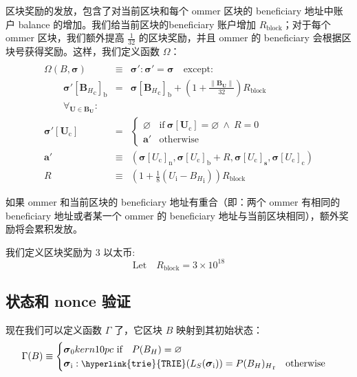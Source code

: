\documentclass[9pt,oneside]{amsart}
\begin{document}
\begin{multicols}{2}
区块奖励的发放，包含了对当前区块和每个 ommer 区块的 beneficiary 地址中账户 balance 的增加。我们给当前区块的beneficiary 账户增加 \hyperlink{R__block}{$R_{\mathrm{block}}$}；对于每个 ommer 区块，我们额外提高 $\frac{1}{32}$ 的区块奖励，并且 ommer 的 beneficiary 会根据区块号获得奖励。\hypertarget{Omega}{}这样，我们定义函数 $\Omega$：
\begin{eqnarray}
\\ \nonumber
\Omega(B, \boldsymbol{\sigma}) & \equiv & \boldsymbol{\sigma}': \boldsymbol{\sigma}' = \boldsymbol{\sigma} \quad \text{except:} \\
\qquad\boldsymbol{\sigma}'[{\mathbf{B}_{H}}_{\mathrm{c}}]_{\mathrm{b}} & = & \boldsymbol{\sigma}[{\mathbf{B}_{H}}_{\mathrm{c}}]_{\mathrm{b}} + \left(1 + \frac{\lVert \mathbf{B}_{\mathbf{U}}\rVert}{32}\right)R_{\mathrm{block}} \\
\qquad\forall_{\mathbf{U} \in \mathbf{B}_{\mathbf{U}}}: \\ \nonumber
\boldsymbol{\sigma}'[\mathbf{U}_{\mathrm{c}}] & = & \begin{cases}
\varnothing &\text{if}\ \boldsymbol{\sigma}[\mathbf{U}_{\mathrm{c}}] = \varnothing\ \wedge\ R = 0 \\
\mathbf{a}' &\text{otherwise}
\end{cases} \\
\mathbf{a}' &\equiv& (\boldsymbol{\sigma}[U_{\mathrm{c}}]_{\mathrm{n}}, \boldsymbol{\sigma}[U_{\mathrm{c}}]_{\mathrm{b}} + R, \boldsymbol{\sigma}[U_{\mathrm{c}}]_{\mathbf{s}}, \boldsymbol{\sigma}[U_{\mathrm{c}}]_{\mathrm{c}}) \\
R & \equiv & \left(1 + \frac{1}{8} (U_{\mathrm{i}} - {B_{H}}_{\mathrm{i}})\right) R_{\mathrm{block}}
\end{eqnarray}

如果 ommer 和当前区块的 beneficiary 地址有重合（即：两个 ommer 有相同的 beneficiary 地址或者某一个 ommer 的 beneficiary 地址与当前区块相同），额外奖励将会累积发放。

我们定义区块奖励为 3 以太币:
\begin{equation}
\text{Let} \quad R_{\mathrm{block}} = 3 \times 10^{18}
\end{equation}

\subsection{状态和 nonce 验证}\label{sec:statenoncevalidation}

\hypertarget{Gamma}{}现在我们可以定义函数 $\Gamma$ 了，它区块 $B$ 映射到其初始状态：
\begin{equation}
\Gamma(B) \equiv \begin{cases}
\boldsymbol{\sigma}_0 kern 10pc \ \text{if} \quad P(B_{H}) = \varnothing \\
\boldsymbol{\sigma}_{\mathrm{i}}: \mathtt{\small \hyperlink{trie}{TRIE}}(L_{S}(\boldsymbol{\sigma}_{\mathrm{i}})) = {P(B_{H})_{H}}_{\mathrm{r}} \quad\text{otherwise}
\end{cases}
\end{equation}


\end{multicols}
\end{document}

